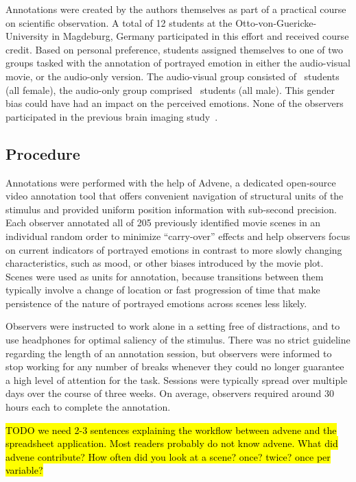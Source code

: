 \documentclass[10pt,a4paper,twocolumn]{article}
\begin{document}
Annotations were created by the authors themselves as part of a practical
course on scientific observation. A total of 12 students at the
Otto-von-Guericke-University in Magdeburg, Germany participated in this effort
and received course credit.  Based on personal preference, students assigned
themselves to one of two groups tasked with the annotation of portrayed emotion
in either the audio-visual movie, or the audio-only version. The audio-visual
group consisted of \AVTotalRaters\ students (all female), the audio-only group
comprised \AOTotalRaters\ students (all male). This gender bias could have had
an impact on the perceived emotions.  None of the observers participated in the
previous brain imaging study~\cite{HBI+14}.

\subsection*{Procedure}

Annotations were performed with the help of Advene\cite{AP2005}, a dedicated
open-source video annotation tool that offers convenient navigation of
structural units of the stimulus and provided uniform position information with
sub-second precision.  Each observer annotated all of 205 previously identified
movie scenes in an individual random order to minimize ``carry-over'' effects
and help observers focus on current indicators of portrayed emotions in
contrast to more slowly changing characteristics, such as mood, or other biases
introduced by the movie plot. Scenes were used as units for annotation, because
transitions between them typically involve a change of location or fast
progression of time that make persistence of the nature of portrayed emotions
across scenes less likely.

Observers were instructed to work alone in a setting free of distractions, and
to use headphones for optimal saliency of the stimulus. There was no strict
guideline regarding the length of an annotation session, but observers were
informed to stop working for any number of breaks whenever they could no longer
guarantee a high level of attention for the task. Sessions were typically
spread over multiple days over the course of three weeks. On average, observers
required around 30 hours each to complete the annotation.

\hl{TODO we need 2-3 sentences explaining the workflow between advene and the
spreadsheet application. Most readers probably do not know advene. What did
advene contribute? How often did you look at a scene? once? twice? once per
variable?}
\end{document}
